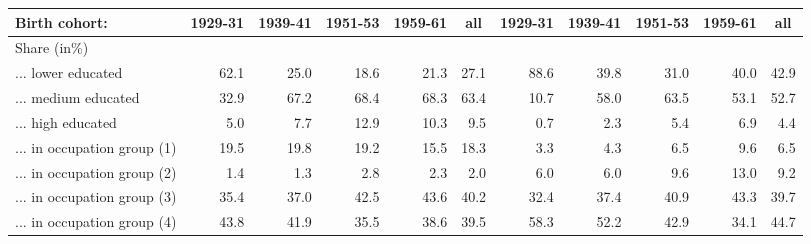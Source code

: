 \begin{Article}
\begin{refsection}[Spitz]
\begin{table}[!ht]
{\begin{tabular}{lrrrrrrrrrr}
\multicolumn{1}{l}{\textbf{Birth cohort:}} & {\textbf{1929-31}} & {\textbf{1939-41}} & {\textbf{1951-53}} & {\textbf{1959-61}} & \multicolumn{1}{c}{\textbf{all}} & {\textbf{1929-31}} & {\textbf{1939-41}} & {\textbf{1951-53}} & {\textbf{1959-61}} & \multicolumn{1}{c}{\textbf{all}} \\ \midrule
\multicolumn{1}{l}{Share (in\%)} & \multicolumn{10}{c}{} \\
... lower educated  & {62.1} & {25.0} & {18.6} & {21.3} & {27.1} & {88.6} & {39.8} & {31.0} & {40.0} & 42.9 \\ 
\multicolumn{1}{l}{... medium educated} & {32.9} & {67.2} & {68.4} & {68.3} & {63.4} & {10.7} & {58.0} & {63.5} & {53.1} & 52.7 \\ 
\multicolumn{1}{l}{... high educated} & {5.0} & {7.7} & {12.9} & {10.3} & {9.5} & {0.7} & {2.3} & {5.4} & {6.9} & 4.4 \\ 
... in occupation group (1) & {19.5} & {19.8} & {19.2} & {15.5} & {18.3} & {3.3} & {4.3} & {6.5} & {9.6} & 6.5 \\ 
... in occupation group (2) & {1.4} & {1.3} & {2.8} & {2.3} & {2.0} & {6.0} & {6.0} & {9.6} & {13.0} & 9.2 \\ 
... in occupation group (3) & {35.4} & {37.0} & {42.5} & {43.6} & {40.2} & {32.4} & {37.4} & {40.9} & {43.3} & 39.7 \\ 
... in occupation group (4) & {43.8} & {41.9} & {35.5} & {38.6} & {39.5} & {58.3} & {52.2} & {42.9} & {34.1} & 44.7 \\ [0.2cm]

\end{tabular}}
\end{table}
\end{refsection}
\end{Article}
